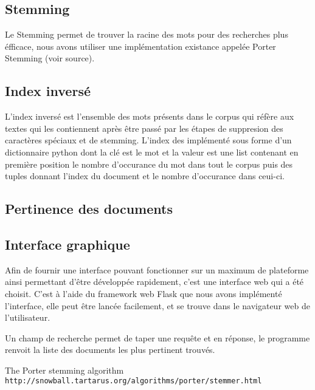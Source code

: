 \documentclass[11pt]{article}
\begin{document}
\subsection{Stemming}
Le Stemming permet de trouver la racine des mots pour des recherches plus éfficace, nous avons utiliser une implémentation existance appelée Porter Stemming (voir source).

\subsection{Index inversé}
L'index inversé est l'ensemble des mots présents dans le corpus qui réfère aux textes qui les contiennent après être passé par les étapes de suppresion des caractères spéciaux et de stemming.
L'index des implémenté sous forme d'un dictionnaire python dont la clé est le mot et la valeur est une list contenant en première position le nombre d'occurance du mot dans tout le corpus puis des tuples donnant l'index du document et le nombre d'occurance dans ceui-ci.

\subsection{Pertinence des documents}


\subsection{Interface graphique}
Afin de fournir une interface pouvant fonctionner sur un maximum de plateforme ainsi permettant d'être développée rapidement, c'est une interface web qui a été choisit.
C'est à l'aide du framework web Flask que nous avons implémenté l'interface, elle peut être lancée facilement, et se trouve dans le navigateur web de l'utilisateur.

Un champ de recherche permet de taper une requête et en réponse, le programme renvoit la liste des documents les plus pertinent trouvés. 

\pagebreak

\begin{thebibliography}{9}

    The Porter stemming algorithm
    \\\texttt{http://snowball.tartarus.org/algorithms/porter/stemmer.html}

\end{thebibliography}
\end{document}

